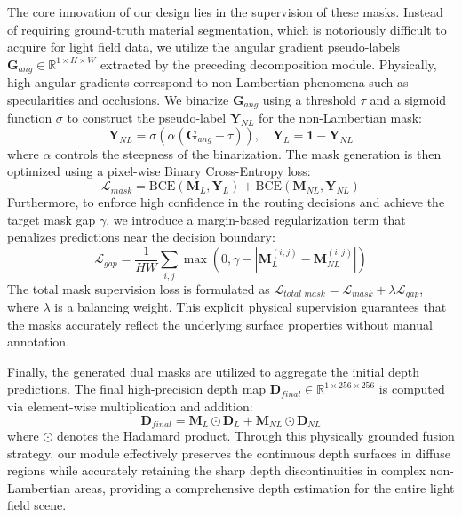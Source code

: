 \documentclass[lettersize,journal]{IEEEtran}
\begin{document}
The core innovation of our design lies in the supervision of these masks. Instead of requiring ground-truth material segmentation, which is notoriously difficult to acquire for light field data, we utilize the angular gradient pseudo-labels $\mathbf{G}_{ang} \in \mathbb{R}^{1 \times H \times W}$ extracted by the preceding decomposition module. Physically, high angular gradients correspond to non-Lambertian phenomena such as specularities and occlusions. We binarize $\mathbf{G}_{ang}$ using a threshold $\tau$ and a sigmoid function $\sigma$ to construct the pseudo-label $\mathbf{Y}_{NL}$ for the non-Lambertian mask:
\begin{equation}
\mathbf{Y}_{NL} = \sigma(\alpha (\mathbf{G}_{ang} - \tau)), \quad \mathbf{Y}_L = \mathbf{1} - \mathbf{Y}_{NL}
\label{eq:ch3_19}
\end{equation}
where $\alpha$ controls the steepness of the binarization. The mask generation is then optimized using a pixel-wise Binary Cross-Entropy loss:
\begin{equation}
\mathcal{L}_{mask} = \text{BCE}(\mathbf{M}_L, \mathbf{Y}_L) + \text{BCE}(\mathbf{M}_{NL}, \mathbf{Y}_{NL})
\label{eq:ch3_20}
\end{equation}
Furthermore, to enforce high confidence in the routing decisions and achieve the target mask gap $\gamma$, we introduce a margin-based regularization term that penalizes predictions near the decision boundary:
\begin{equation}
\mathcal{L}_{gap} = \frac{1}{HW} \sum_{i,j} \max(0, \gamma - |\mathbf{M}_L^{(i,j)} - \mathbf{M}_{NL}^{(i,j)}|)
\label{eq:ch3_21}
\end{equation}
The total mask supervision loss is formulated as $\mathcal{L}_{total\_mask} = \mathcal{L}_{mask} + \lambda \mathcal{L}_{gap}$, where $\lambda$ is a balancing weight. This explicit physical supervision guarantees that the masks accurately reflect the underlying surface properties without manual annotation.

Finally, the generated dual masks are utilized to aggregate the initial depth predictions. The final high-precision depth map $\mathbf{D}_{final} \in \mathbb{R}^{1 \times 256 \times 256}$ is computed via element-wise multiplication and addition:
\begin{equation}
\mathbf{D}_{final} = \mathbf{M}_L \odot \mathbf{D}_L + \mathbf{M}_{NL} \odot \mathbf{D}_{NL}
\label{eq:ch3_22}
\end{equation}
where $\odot$ denotes the Hadamard product. Through this physically grounded fusion strategy, our module effectively preserves the continuous depth surfaces in diffuse regions while accurately retaining the sharp depth discontinuities in complex non-Lambertian areas, providing a comprehensive depth estimation for the entire light field scene.
\end{document}
